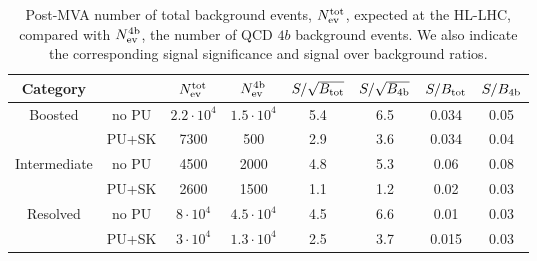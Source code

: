 \begin{table}[h]
  \centering
  \small
  \begin{tabular}{|c|c|c|c||c|c||c|c|}
        \hline
        Category  &    &  $N_{\rm ev}^{\rm tot}$  &  $N_{\rm ev}^{\rm 4b}$   &
        $S/\sqrt{B_{\rm tot}}$ & $S/\sqrt{B_{\rm 4b}}$  
        &  $S/B_{\rm tot}$ & $S/B_{\rm 4b}$\\ 
    \hline
    \hline
    \multirow{2}{*}{Boosted} &  no PU  & $2.2\cdot 10^4$  & $1.5\cdot 10^4$     & 
      5.4 &  6.5 & 0.034 & 0.05 \\
    & PU+SK & 7300  &  500  &  2.9  & 3.6 &  0.034 & 0.04 \\
    \hline
    \hline
    \multirow{2}{*}{Intermediate} &  no PU   & 4500  & 2000    &
    4.8  &  5.3 &  0.06  &  0.08 \\
    & PU+SK  & 2600   &  1500  & 1.1  & 1.2 & 0.02 & 0.03 \\
    \hline
    \hline
    \multirow{2}{*}{Resolved} &   no PU  & $8\cdot 10^4$   &
    $4.5\cdot 10^4$
    & 4.5  & 6.6  & 0.01 & 0.03 \\
    & PU+SK  &  $3\cdot 10^4$   &   $1.3\cdot 10^4$ & 2.5    & 3.7  & 0.015 & 0.03 \\
    \hline
      \end{tabular}
  \caption{\small Post-MVA number of total background events, $N_{\rm ev}^{\rm tot}$,
    expected at the HL-LHC, compared
    with $N_{\rm ev}^{\rm 4b}$,
    the number of QCD $4b$ background events.
    We also indicate the corresponding signal significance and signal over background
    ratios.
        \label{table:cutflowMVA_fakes}
  }
\end{table}




